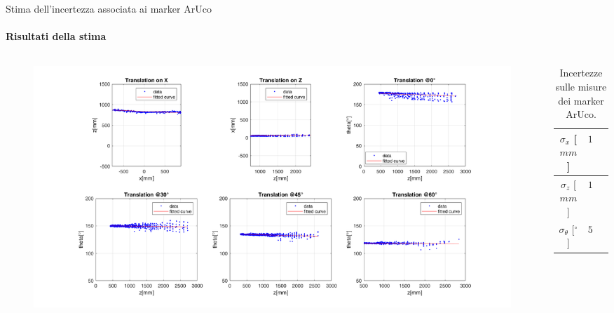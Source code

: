 \documentclass{beamer}
\begin{document}
\begin{frame}{Stima dell'incertezza associata ai marker ArUco}
\framesubtitle{Risultati della stima}
\begin{columns}
    \begin{column}{0.8\textwidth}
        \begin{figure}
            \centering
            \includegraphics[width=\textwidth]{images/arucoreg.png}
            \label{fig:arucoreg}
        \end{figure}
    \end{column}
    \begin{column}{0.2\textwidth}
        \begin{table}[h]
            \centering
            \begin{tabular}{|c|c|c|}
                \hline
                $\sigma_x$ [$mm$] & $13$\\
                \hline
                $\sigma_z$ [$mm$] & $19$\\ 
                \hline
                $\sigma_{\theta}$ [$^{\circ}$] &$5.7$\\
                \hline
            \end{tabular}
            \caption{Incertezze sulle misure dei marker ArUco.}
            \label{tab:uaruco}
        \end{table}
    \end{column}
\end{columns}
\end{frame}
\end{document}
